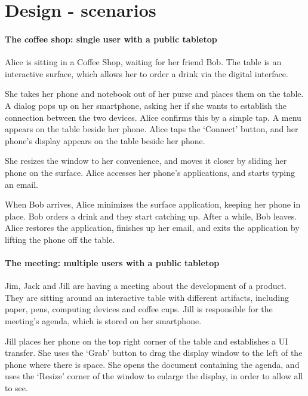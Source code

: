 \chapter{Design - scenarios}
\label{scenarios}

\subsubsection*{The coffee shop: single user with a public tabletop}

Alice is sitting in a Coffee Shop, waiting for her friend Bob.
The table is an interactive surface, which allows her to order a drink via the digital interface.

She takes her phone and notebook out of her purse and places them on the table. 
A dialog pops up on her smartphone, asking her if she wants to establish the connection between the two devices.
Alice confirms this by a simple tap.
A menu appears on the table beside her phone. 
Alice taps the `Connect' button, and her phone's display appears on the table beside her phone.

She resizes the window to her convenience, and moves it closer by sliding her phone on the surface. 
Alice accesses her phone's applications, and starts typing an email.

When Bob arrives, Alice minimizes the surface application, keeping her phone in place. 
Bob orders a drink and they start catching up. 
After a while, Bob leaves. 
Alice restores the application, finishes up her email, and exits the application by lifting the phone off the table.

\subsubsection*{The meeting: multiple users with a public tabletop}

Jim, Jack and Jill are having a meeting about the development of a product. 
They are sitting around an interactive table with different artifacts, including paper, pens, computing devices and coffee cups. 
Jill is responsible for the meeting's agenda, which is stored on her smartphone.

Jill places her phone on the top right corner of the table and establishes a UI transfer. 
She uses the `Grab' button to drag the display window to the left of the phone where there is space. 
She opens the document containing the agenda, and uses the `Resize' corner of the window to enlarge the display, in order to allow all to see.

